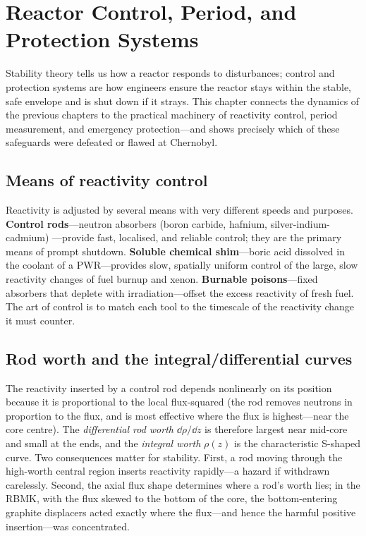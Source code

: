 \chapter{Reactor Control, Period, and Protection Systems}
\label{ch:control}

Stability theory tells us how a reactor responds to disturbances; control and
protection systems are how engineers ensure the reactor stays within the stable,
safe envelope and is shut down if it strays. This chapter connects the dynamics of
the previous chapters to the practical machinery of reactivity control, period
measurement, and emergency protection---and shows precisely which of these
safeguards were defeated or flawed at Chernobyl.

\section{Means of reactivity control}

Reactivity is adjusted by several means with very different speeds and purposes.
\textbf{Control rods}---neutron absorbers (boron carbide, hafnium, silver-indium-cadmium)
---provide fast, localised, and reliable control; they are the primary means of
prompt shutdown. \textbf{Soluble chemical shim}---boric acid dissolved in the
coolant of a PWR---provides slow, spatially uniform control of the large, slow
reactivity changes of fuel burnup and xenon. \textbf{Burnable poisons}---fixed
absorbers that deplete with irradiation---offset the excess reactivity of fresh
fuel. The art of control is to match each tool to the timescale of the reactivity
change it must counter.

\section{Rod worth and the integral/differential curves}

The reactivity inserted by a control rod depends nonlinearly on its position
because it is proportional to the local flux-squared (the rod removes neutrons in
proportion to the flux, and is most effective where the flux is highest---near the
core centre). The \emph{differential rod worth} $\dd\rho/\dd z$ is therefore
largest near mid-core and small at the ends, and the \emph{integral worth}
$\rho(z)$ is the characteristic S-shaped curve. Two consequences matter for
stability. First, a rod moving through the high-worth central region inserts
reactivity rapidly---a hazard if withdrawn carelessly. Second, the axial flux
shape determines where a rod's worth lies; in the RBMK, with the flux skewed to the
bottom of the core, the bottom-entering graphite displacers acted exactly where the
flux---and hence the harmful positive insertion---was concentrated.

